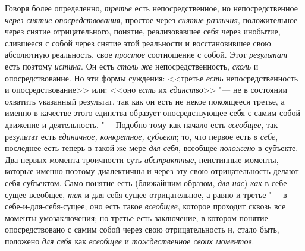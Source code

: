{{Говоря более определенно, {\em третье} есть
непосредственное, но непосредственное
{\em через снятие опосредствования}, простое через {\em снятие
различия}, положительное через снятие отрицательного,
понятие, реализовавшее себя через инобытие, слившееся с собой через снятие
этой реальности и восстановившее свою абсолютную реальность, свое
{\em простое} соотношение с собой. Этот {\em результат} есть поэтому
{\em истина}. Он есть {\em столь же} непосредственность, {\em сколь} и
опосредствование. Но эти формы суждения: <<третье {\em есть}
непосредственность и опосредствование>> или: <<оно {\em есть} их
{\em единство}>> "--- не в
состоянии охватить указанный результат, так как он есть не некое покоящееся
третье, а именно в качестве этого единства образует опосредствующее себя с
самим собой движение и деятельность. "--- Подобно тому как
начало есть {\em всеобщее}, так результат есть
{\em единичное, конкретное, субъект}; то, что первое есть {\em в
себе}, последнее есть теперь в такой же мере {\em для себя}, всеобщее
{\em положено} в субъекте. Два первых момента троичности суть
{\em абстрактные}, неистинные моменты, которые именно поэтому диалектичны и
через эту свою отрицательность делают себя субъектом. Само понятие есть
(ближайшим образом, {\em для нас}) {\em как} в-себе-сущее
всеобщее, {\em так} и для-себя-сущее отрицательное, а равно и третье
"--- в-себе-и-для-себя-сущее; оно есть такое {\em всеобщее}, которое
проходит сквозь все моменты умозаключения; но третье есть заключение, в
котором понятие опосредствовано с самим собой через свою отрицательность и,
стало быть, положено {\em для себя} как {\em всеобщее}
и {\em тождественное своих моментов}.

}}
